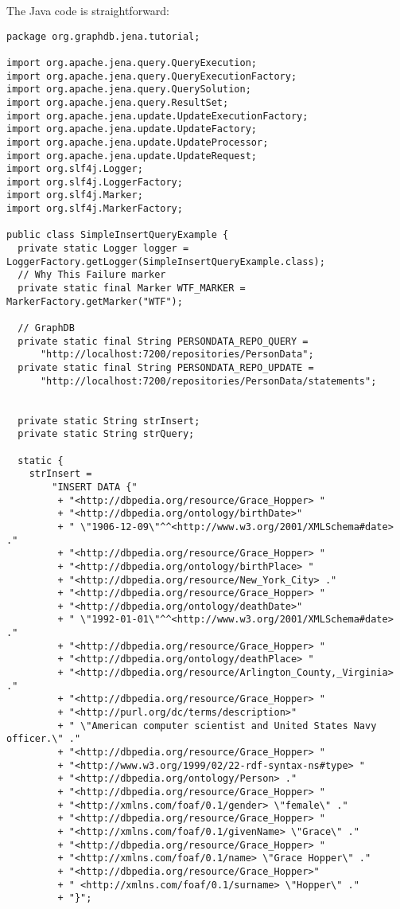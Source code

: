 \documentclass{amsart}
\begin{document}
 The Java code is straightforward:
\begin{small}
\begin{verbatim} 
package org.graphdb.jena.tutorial;

import org.apache.jena.query.QueryExecution;
import org.apache.jena.query.QueryExecutionFactory;
import org.apache.jena.query.QuerySolution;
import org.apache.jena.query.ResultSet;
import org.apache.jena.update.UpdateExecutionFactory;
import org.apache.jena.update.UpdateFactory;
import org.apache.jena.update.UpdateProcessor;
import org.apache.jena.update.UpdateRequest;
import org.slf4j.Logger;
import org.slf4j.LoggerFactory;
import org.slf4j.Marker;
import org.slf4j.MarkerFactory;

public class SimpleInsertQueryExample {
  private static Logger logger = LoggerFactory.getLogger(SimpleInsertQueryExample.class);
  // Why This Failure marker
  private static final Marker WTF_MARKER = MarkerFactory.getMarker("WTF");
  
  // GraphDB 
  private static final String PERSONDATA_REPO_QUERY = 
      "http://localhost:7200/repositories/PersonData";
  private static final String PERSONDATA_REPO_UPDATE = 
      "http://localhost:7200/repositories/PersonData/statements";


  private static String strInsert;
  private static String strQuery;
  
  static {
    strInsert = 
        "INSERT DATA {"
         + "<http://dbpedia.org/resource/Grace_Hopper> "
         + "<http://dbpedia.org/ontology/birthDate>"
         + " \"1906-12-09\"^^<http://www.w3.org/2001/XMLSchema#date> ."
         + "<http://dbpedia.org/resource/Grace_Hopper> "
         + "<http://dbpedia.org/ontology/birthPlace> "
         + "<http://dbpedia.org/resource/New_York_City> ."
         + "<http://dbpedia.org/resource/Grace_Hopper> "
         + "<http://dbpedia.org/ontology/deathDate>"
         + " \"1992-01-01\"^^<http://www.w3.org/2001/XMLSchema#date> ."
         + "<http://dbpedia.org/resource/Grace_Hopper> "
         + "<http://dbpedia.org/ontology/deathPlace> "
         + "<http://dbpedia.org/resource/Arlington_County,_Virginia> ."
         + "<http://dbpedia.org/resource/Grace_Hopper> "
         + "<http://purl.org/dc/terms/description>"
         + " \"American computer scientist and United States Navy officer.\" ."
         + "<http://dbpedia.org/resource/Grace_Hopper> "
         + "<http://www.w3.org/1999/02/22-rdf-syntax-ns#type> "
         + "<http://dbpedia.org/ontology/Person> ."
         + "<http://dbpedia.org/resource/Grace_Hopper> "
         + "<http://xmlns.com/foaf/0.1/gender> \"female\" ."
         + "<http://dbpedia.org/resource/Grace_Hopper> "
         + "<http://xmlns.com/foaf/0.1/givenName> \"Grace\" ."
         + "<http://dbpedia.org/resource/Grace_Hopper> "
         + "<http://xmlns.com/foaf/0.1/name> \"Grace Hopper\" ."
         + "<http://dbpedia.org/resource/Grace_Hopper>"
         + " <http://xmlns.com/foaf/0.1/surname> \"Hopper\" ."        
         + "}";
    

\end{verbatim}
\end{small}
\end{document}
